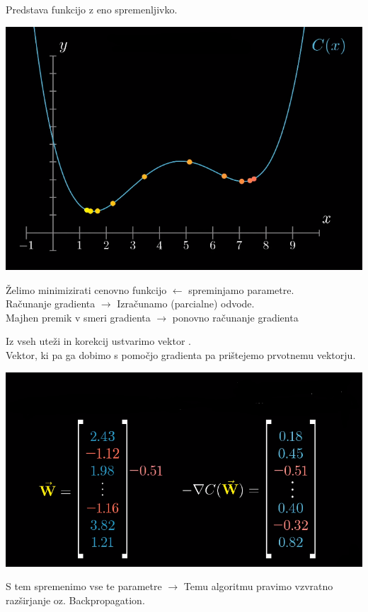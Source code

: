 \documentclass{beamer}
\begin{document}
\begin{frame}{}
Predstava funkcijo z eno spremenljivko.\\
\smallskip
\begin{center}
\includegraphics[scale = 0.3]{photo/2foto1} \\
\end{center}

Želimo minimizirati cenovno funkcijo $\leftarrow$ spreminjamo parametre. \\

Računanje gradienta $\rightarrow$ Izračunamo (parcialne) odvode. \\
Majhen premik v smeri gradienta $\rightarrow$ ponovno računanje gradienta
\end{frame}

\begin{frame}{}
Iz vseh uteži in korekcij ustvarimo vektor .\\
\smallskip
Vektor, ki pa ga dobimo s pomočjo gradienta pa prištejemo prvotnemu vektorju. \\

\begin{center}
\includegraphics[scale = 0.35]{photo/2foto4} \\
\end{center}

S tem spremenimo vse te parametre $\rightarrow$ Temu algoritmu pravimo vzvratno razširjanje oz. Backpropagation.
\end{frame}
\end{document}
